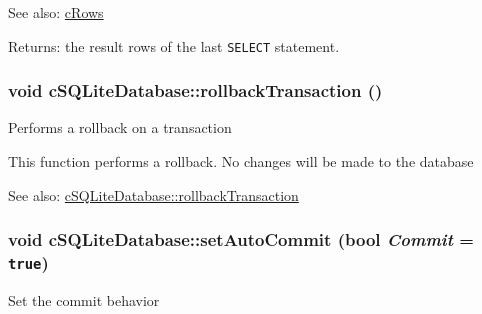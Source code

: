 \begin{Desc}
\item[See also:]\hyperlink{classcRows}{cRows} \end{Desc}
\begin{Desc}
\item[Returns:]the result rows of the last {\tt SELECT} statement. \end{Desc}
\hypertarget{classcSQLiteDatabase_e20eff598832e1da41a8e915ee807548}{
\subsubsection[{rollbackTransaction}]{\setlength{\rightskip}{0pt plus 5cm}void cSQLiteDatabase::rollbackTransaction ()}}
\label{classcSQLiteDatabase_e20eff598832e1da41a8e915ee807548}


Performs a rollback on a transaction

This function performs a rollback. No changes will be made to the database

\begin{Desc}
\item[See also:]\hyperlink{classcSQLiteDatabase_e20eff598832e1da41a8e915ee807548}{cSQLiteDatabase::rollbackTransaction} \end{Desc}
\hypertarget{classcSQLiteDatabase_b1749baadeb733ea3efdbbd9ffe83253}{
\subsubsection[{setAutoCommit}]{\setlength{\rightskip}{0pt plus 5cm}void cSQLiteDatabase::setAutoCommit (bool {\em Commit} = {\tt true})}}
\label{classcSQLiteDatabase_b1749baadeb733ea3efdbbd9ffe83253}


Set the commit behavior

